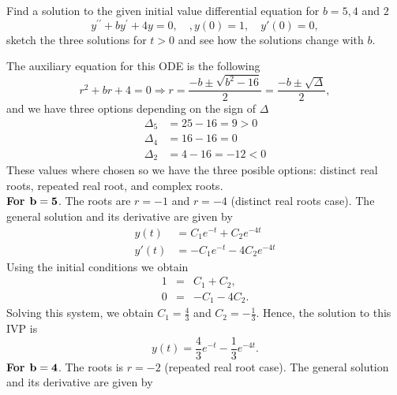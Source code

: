 \documentclass[11pt]{article}
\begin{document}
\begin{problem}
Find a solution to the given initial value differential equation for $b=5, 4$ and $2$
\begin{equation}
\label{equ:prob07}
y^{\prime \prime} + b y^{\prime} + 4 y =0, \quad, y(0)=1, \quad y'(0)=0,
\end{equation}
sketch the three solutions for $t>0$ and see how the solutions change with $b$.
\end{problem}
\begin{solution}
The auxiliary equation for this ODE is the following
\begin{equation*}
r^2 + b r + 4 =0 \Rightarrow r = \frac{-b\pm \sqrt{b^{2}-16}}{2} =\frac{-b\pm \sqrt{\Delta}}{2},
\end{equation*}
and we have three options depending on the sign of $\Delta$
\begin{equation*}
\begin{split}
     \Delta_{5}&=25-16 =9 >0 \\
     \Delta_{4}&=16-16 = 0 \\
     \Delta_{2}&=4-16 = -12 <0 
\end{split}
\end{equation*}
These values where chosen so we have the three posible options: distinct real roots, repeated real root, and complex roots.\\
\textbf{For $\bf b=5$}. The roots are $r=-1$ and $r=-4$ (distinct real roots case). 
The general solution and its derivative are given by
\begin{equation*}
\begin{split}
y(t) &= C_{1} e^{-t}  + C_{2} e^{-4t} \\
y'(t) &= - C_{1} e^{-t}  -4 C_{2} e^{-4t}
\end{split}
\end{equation*}
Using the initial conditions we obtain
\begin{eqnarray*}
1 &=& C_{1} + C_{2},\\
0 &=& -C_{1} -4 C_{2}.
\end{eqnarray*}
Solving this system, we obtain $C_{1} = \frac{4}{3}$ and $C_{2} = -\frac{1}{3}$.
Hence, the solution to this IVP is
\begin{equation*}
\boxed{ y(t) = \frac{4}{3}e^{-t} - \frac{1}{3}e^{-4t}}.
\end{equation*}
\textbf{For $\bf b=4$}. The roots is $r=-2$ (repeated real root case).
The general solution and its derivative are given by
\begin{equation*}

\end{equation*}
\end{solution}
\end{document}

